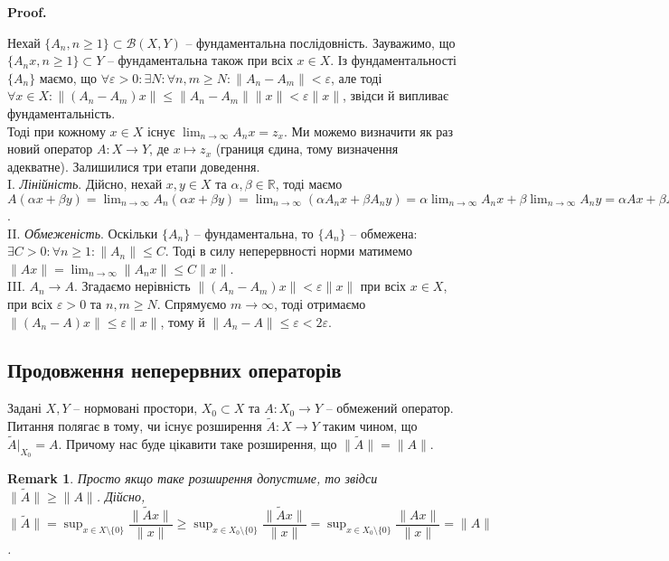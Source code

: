 \documentclass[a4paper, 10pt]{article}
\makeatletter
\theoremstyle{theoremdd}
\theoremstyle{theoremdd}
\theoremstyle{theoremdd}
\theoremstyle{theoremdd}
\theoremstyle{theoremdd}
\theoremstyle{theoremdd}
\newtheorem{remark}[theorem]{Remark}
\theoremstyle{theoremdd}
\theoremstyle{theoremdd}
\renewenvironment{proof}[1][Proof.\\]{\par
\pushQED{\hfill \qed}%
\normalfont \topsep6\p@\@plus6\p@\relax
\trivlist
\item\relax
{\bfseries
#1\@addpunct{.}}\hspace\labelsep\ignorespaces
}{%
\popQED\endtrivlist\@endpefalse
}
\makeatother
\begin{document}
\begin{proof}
Нехай $\{A_n, n \geq 1\} \subset \mathcal{B}(X,Y)$ -- фундаментальна послідовність. Зауважимо, що $\{A_nx, n \geq 1\} \subset Y$ -- фундаментальна також при всіх $x \in X$. Із фундаментальності $\{A_n\}$ маємо, що $\forall \varepsilon > 0: \exists N: \forall n,m \geq N: \|A_n-A_m\| < \varepsilon$, але тоді $\forall x \in X: \|(A_n-A_m)x\| \leq \|A_n-A_m\| \|x\| < \varepsilon \|x\|$, звідси й випливає фундаментальність.\\
Тоді при кожному $x \in X$ існує $\displaystyle\lim_{n \to \infty} A_n x = z_x$. Ми можемо визначити як раз новий оператор $A \colon X \to Y$, де $x \mapsto z_x$ (границя єдина, тому визначення адекватне). Залишилися три етапи доведення.\\
I. \textit{Лінійність}. \quad Дійсно, нехай $x,y \in X$ та $\alpha,\beta \in \mathbb{R}$, тоді маємо\\
$A(\alpha x + \beta y) = \displaystyle\lim_{n \to \infty} A_n(\alpha x + \beta y) = \lim_{n \to \infty} (\alpha A_nx + \beta A_n y) = \alpha \lim_{n \to \infty} A_n x + \beta \lim_{n \to \infty} A_n y = \alpha Ax + \beta Ay$.\\
II. \textit{Обмеженість}. \quad Оскільки $\{A_n\}$ -- фундаментальна, то $\{A_n\}$ -- обмежена: $\exists C > 0: \forall n \geq 1: \|A_n\| \leq C$. Тоді в силу неперервності норми матимемо $\|Ax\| = \displaystyle\lim_{n \to \infty} \|A_nx\| \leq C \|x\|$.\\
III. \textit{$A_n \to A$}. \quad Згадаємо нерівність $\|(A_n-A_m)x\| < \varepsilon \|x\|$ при всіх $x \in X$, при всіх $\varepsilon > 0$ та $n,m \geq N$. Спрямуємо $m \to \infty$, тоді отримаємо $\|(A_n-A)x\| \leq \varepsilon \|x\|$, тому й $\|A_n-A\| \leq \varepsilon < 2\varepsilon$.
\end{proof}

\subsection{Продовження неперервних операторів}
Задані $X,Y$ -- нормовані простори, $X_0 \subset X$ та $A \colon X_0 \to Y$ -- обмежений оператор. Питання полягає в тому, чи існує розширення $\tilde{A} \colon X \to Y$ таким чином, що $\tilde{A}|_{X_0} = A$. Причому нас буде цікавити таке розширення, що $\|\tilde{A}\| = \|A\|$.

\begin{remark}
Просто якщо таке розширення допустиме, то звідси $\|\tilde{A}\| \geq \|A\|$. Дійсно,\\
$\|\tilde{A}\| = \displaystyle\sup_{x \in X \setminus \{0\}} \dfrac{\|\tilde{A}x\|}{\|x\|} \geq \sup_{x \in X_0 \setminus \{0\}} \dfrac{\|\tilde{A}x\|}{\|x\|} = \sup_{x \in X_0 \setminus \{0\}} \dfrac{\|Ax\|}{\|x\|} = \|A\|$.
\end{remark}
\end{document}
